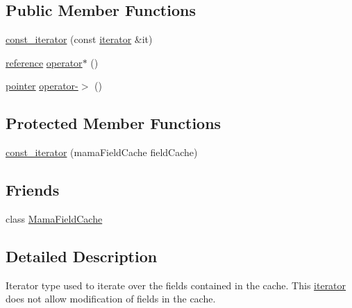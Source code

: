 \subsection*{Public Member Functions}
\begin{DoxyCompactItemize}
\item 
\hyperlink{classWombat_1_1MamaFieldCache_1_1const__iterator_a50ca8d2c3267279b1209797d88a79d4f}{const\_\-iterator} (const \hyperlink{classWombat_1_1MamaFieldCache_1_1iterator}{iterator} \&it)
\item 
\hyperlink{classWombat_1_1MamaFieldCacheField}{reference} \hyperlink{classWombat_1_1MamaFieldCache_1_1const__iterator_ad6b81b820a533de68fec3accce6df476}{operator$\ast$} ()
\item 
\hyperlink{classWombat_1_1MamaFieldCacheField}{pointer} \hyperlink{classWombat_1_1MamaFieldCache_1_1const__iterator_af557d4888d3e7c3dc3220979a0c3af41}{operator-\/$>$} ()
\end{DoxyCompactItemize}
\subsection*{Protected Member Functions}
\begin{DoxyCompactItemize}
\item 
\hyperlink{classWombat_1_1MamaFieldCache_1_1const__iterator_a5cb4bfbb7bf267fb2d2cc7e3b7b411fe}{const\_\-iterator} (mamaFieldCache fieldCache)
\end{DoxyCompactItemize}
\subsection*{Friends}
\begin{DoxyCompactItemize}
\item 
class \hyperlink{classWombat_1_1MamaFieldCache_1_1const__iterator_a6a1b5aceea64638fc294b40bdb9251fb}{MamaFieldCache}
\end{DoxyCompactItemize}


\subsection{Detailed Description}
Iterator type used to iterate over the fields contained in the cache. This \hyperlink{classWombat_1_1MamaFieldCache_1_1iterator}{iterator} does not allow modification of fields in the cache. 

